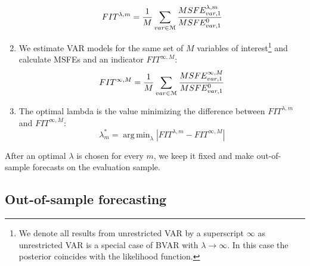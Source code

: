 \documentclass[11pt]{article} %
\DeclareMathOperator*{\argmin}{arg\,min}
\begin{document}
\begin{enumerate}
\begin{equation}
FIT^{\lambda,m}=\frac{1}{M} \sum_{var\in \EuScript{M}} \frac{MSFE_{var,1}^{\lambda,m}}{MSFE_{var,1}^{0}}
\end{equation}
\item We estimate  VAR models for the same set of $M$ variables of interest\footnote{We denote all results from unrestricted VAR by a superscript $\infty$ as unrestricted VAR is a special case of BVAR with
$\lambda\to \infty$. In this case the posterior coincides with the likelihood function.} and calculate MSFEs and an indicator $FIT^{\infty,M}$:
\begin{equation}
FIT^{\infty,M}=\frac{1}{M} \sum_{var\in \EuScript{M}} \frac{MSFE_{var,1}^{\infty,M}}{MSFE_{var,1}^{0}}
\end{equation}

\item The optimal lambda is the value minimizing the difference between $FIT^{\lambda,m}$ and $FIT^{\infty,M}$:
\begin{equation}
\lambda^*_m=\argmin_{\lambda} |FIT^{\lambda, m}-FIT^{\infty,M}| 
\end{equation}
\end{enumerate}
After an optimal $\lambda$ is chosen for every $m$, we keep it fixed  and make out-of-sample forecasts on the evaluation sample.  


\subsection{Out-of-sample forecasting}
\end{document}
